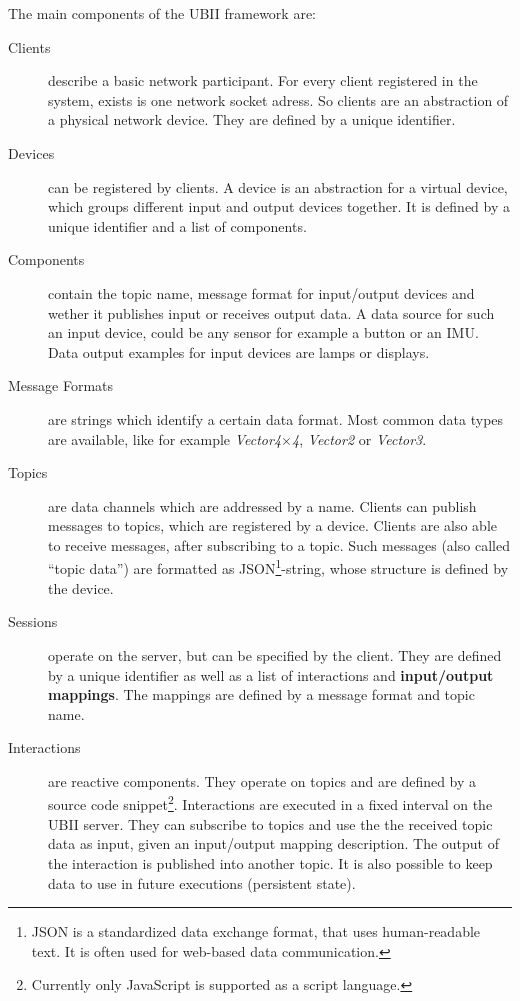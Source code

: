The main components of the \ac{UBII} framework are:
\begin{description}
	\item[Clients] describe a basic network participant. For every client registered in the system, exists is one network socket adress. So clients are an abstraction of a physical network device. They are defined by a unique identifier. 
	\item[Devices] can be registered by clients. A device is an abstraction for a virtual device, which groups different input and output devices together. It is defined by a unique identifier and a list of components.
  \item[Components] contain the topic name, message format for input/output devices and wether it publishes input or receives output data. A data source for such an input device, could be any sensor for example a button or an \ac{IMU}. Data output examples for input devices are lamps or displays.
  \item[Message Formats] are strings which identify a certain data format. Most common data types are available, like for example \textit{Vector4\( \times \)4}, \textit{Vector2} or \textit{Vector3}.
	\item[Topics] are data channels which are addressed by a name. Clients can publish messages to topics, which are registered by a device. Clients are also able to receive messages, after subscribing to a topic. Such messages (also called \enquote{topic data}) are formatted as JSON\footnote{JSON is a standardized data exchange format, that uses human-readable text. It is often used for web-based data communication.}-string, whose structure is defined by the device.
	\item[Sessions] operate on the server, but can be specified by the client. They are defined by a unique identifier as well as a list of interactions and \textbf{input/output mappings}. The mappings are defined by a message format and topic name.
	\item[Interactions] are reactive components. They operate on topics and are defined by a source code snippet\footnote{Currently only JavaScript is supported as a script language.}. Interactions are executed in a fixed interval on the \ac{UBII} server. They can subscribe to topics and use the the received topic data as input, given an input/output mapping description. The output of the interaction is published into another topic. It is also possible to keep data to use in future executions (persistent state).
\end{description}

